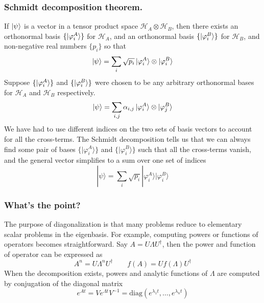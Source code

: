 \documentclass[../../../main.tex]{subfiles}
\begin{document}
\subsubsection{Schmidt decomposition theorem.}
If $\ket{\psi}$ is a vector in a tensor product space $\mathcal{H}_A \otimes \mathcal{H}_B$, then there exists an orthonormal basis $\{ \ket{\varphi^A_i} \}$ for $\mathcal{H}_A$, and an orthonormal basis $\{ \ket{\varphi^B_i} \}$ for $\mathcal{H}_B$, and non-negative real numbers $\{ p_i \}$ so that
\begin{equation*}
	\ket{\psi} = \sum_i \sqrt{p_i} \ket{\varphi^A_i} \otimes \ket{\varphi^B_i}
\end{equation*}
Suppose $\{ \ket{\varphi^A_i} \}$ and $\{ \ket{\varphi^B_i} \}$ were chosen to be any arbitrary orthonormal bases for $\mathcal{H}_A$ and $\mathcal{H}_B$ respectively.
\begin{equation*}
	\ket{\psi} = \sum_{i,j} \alpha_{i,j} \ket{\varphi^A_i} \otimes \ket{\varphi^B_j}
\end{equation*}
We have had to use different indices on the two sets of basis vectors to account for all the cross-terms.
The Schmidt decomposition tells us that we can always find some pair of bases $\{|\varphi^A_i\rangle\}$ and $\{|\varphi^B_i\rangle\}$ such that all the cross-terms vanish, and the general vector simplifies to a sum over one set of indices
\begin{equation*}
	|\psi\rangle = \sum_i \sqrt{p_i} |\varphi^A_i\rangle |\varphi^B_i\rangle
\end{equation*}

\subsubsection{What's the point?}
The purpose of diagonalization is that many problems reduce to elementary scalar problems in the eigenbasis.
For example, computing powers or functions of operators becomes straightforward.
Say $A=U\Lambda U ^\dagger$, then the power and  function of operator can be expressed as
\begin{equation*}
	A^{n} = U \Lambda^{n} U^{\dagger}\qquad
	f(A) = U f(\Lambda) U^{\dagger}
\end{equation*}
When the decomposition exists, powers and analytic functions of $\Lambda$ are computed by conjugation of the diagonal matrix
\begin{equation*}
	e^{A t} = Ve^{\Lambda t}V^{-1} = \mathrm{diag}(e^{\lambda_{1}t}, \dots, e^{\lambda_{n}t})
\end{equation*}
\end{document}
